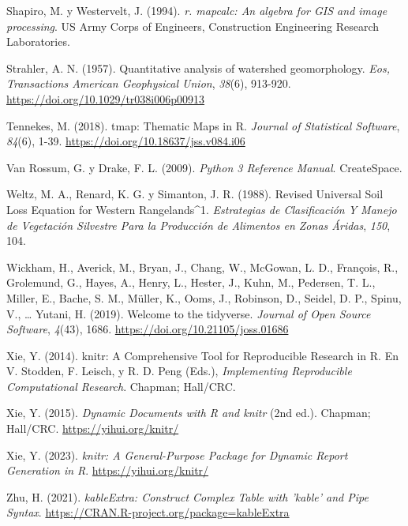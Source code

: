 \documentclass[spanish]{article}
\newlength{\cslhangindent}
\newlength{\cslentryspacingunit} %
\newenvironment{CSLReferences}[2] %
 {%
  \setlength{\parindent}{0pt}
  \ifodd #1
  \let\oldpar\par
  \def\par{\hangindent=\cslhangindent\oldpar}
  \fi
  \setlength{\parskip}{#2\cslentryspacingunit}
 }%
 {}
\begin{document}
\begin{CSLReferences}{1}{0}
\leavevmode{}%
Shapiro, M. y Westervelt, J. (1994). \emph{r. mapcalc: An algebra for
GIS and image processing}. US Army Corps of Engineers, Construction
Engineering Research Laboratories.

\leavevmode{}%
Strahler, A. N. (1957). Quantitative analysis of watershed
geomorphology. \emph{Eos, Transactions American Geophysical Union},
\emph{38}(6), 913-920. \url{https://doi.org/10.1029/tr038i006p00913}

\leavevmode{}%
Tennekes, M. (2018). {tmap}: Thematic Maps in {R}. \emph{Journal of
Statistical Software}, \emph{84}(6), 1-39.
\url{https://doi.org/10.18637/jss.v084.i06}

\leavevmode{}%
Van Rossum, G. y Drake, F. L. (2009). \emph{Python 3 Reference Manual}.
CreateSpace.

\leavevmode{}%
Weltz, M. A., Renard, K. G. y Simanton, J. R. (1988). Revised Universal
Soil Loss Equation for Western Rangelands{\^{}}1. \emph{Estrategias de
Clasificación Y Manejo de Vegetación Silvestre Para la Producción de
Alimentos en Zonas Áridas}, \emph{150}, 104.

\leavevmode{}%
Wickham, H., Averick, M., Bryan, J., Chang, W., McGowan, L. D.,
François, R., Grolemund, G., Hayes, A., Henry, L., Hester, J., Kuhn, M.,
Pedersen, T. L., Miller, E., Bache, S. M., Müller, K., Ooms, J.,
Robinson, D., Seidel, D. P., Spinu, V., \ldots{} Yutani, H. (2019).
Welcome to the {tidyverse}. \emph{Journal of Open Source Software},
\emph{4}(43), 1686. \url{https://doi.org/10.21105/joss.01686}

\leavevmode{}%
Xie, Y. (2014). knitr: A Comprehensive Tool for Reproducible Research in
{R}. En V. Stodden, F. Leisch, y R. D. Peng (Eds.), \emph{Implementing
Reproducible Computational Research}. Chapman; Hall/CRC.

\leavevmode{}%
Xie, Y. (2015). \emph{Dynamic Documents with {R} and knitr} (2nd ed.).
Chapman; Hall/CRC. \url{https://yihui.org/knitr/}

\leavevmode{}%
Xie, Y. (2023). \emph{knitr: A General-Purpose Package for Dynamic
Report Generation in R}. \url{https://yihui.org/knitr/}

\leavevmode{}%
Zhu, H. (2021). \emph{kableExtra: Construct Complex Table with 'kable'
and Pipe Syntax}. \url{https://CRAN.R-project.org/package=kableExtra}

\end{CSLReferences}



\end{document}
